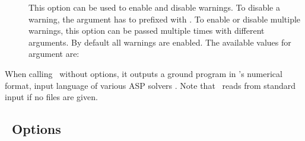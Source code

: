 \begin{description}
\item[]
This option can be used to enable and disable warnings.
To disable a warning, the argument has to prefixed with .
To enable or disable multiple warnings, this option can be passed multiple times with different arguments.
By default all warnings are enabled.
The available values for argument  are:
\end{description}
%
When calling \gringo\ without options,
it outputs a ground program in \lparse's numerical format,
input language of various ASP solvers \cite{gekanesc07b,siniso02a,linzha04a}.
Note that \gringo\ reads from standard input if no files are given.

\subsection{\clingo\ Options}\label{subsec:opt:clingo}


